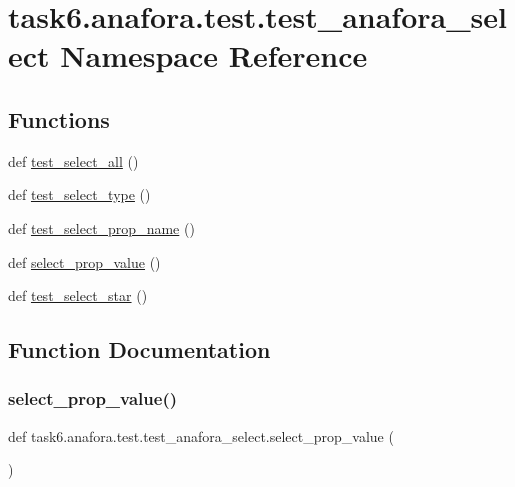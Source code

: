 \hypertarget{namespacetask6_1_1anafora_1_1test_1_1test__anafora__select}{}\section{task6.\+anafora.\+test.\+test\+\_\+anafora\+\_\+select Namespace Reference}
\label{namespacetask6_1_1anafora_1_1test_1_1test__anafora__select}
\subsection*{Functions}
\begin{DoxyCompactItemize}
\item 
def \hyperlink{namespacetask6_1_1anafora_1_1test_1_1test__anafora__select_a88d2142e3e1d6f6ad71cad02f3793e15}{test\+\_\+select\+\_\+all} ()
\item 
def \hyperlink{namespacetask6_1_1anafora_1_1test_1_1test__anafora__select_a9f2f63d4ae51a93c6a11aba7c5f16485}{test\+\_\+select\+\_\+type} ()
\item 
def \hyperlink{namespacetask6_1_1anafora_1_1test_1_1test__anafora__select_a032b0ab5ca00e4ae677f5badbe7a7339}{test\+\_\+select\+\_\+prop\+\_\+name} ()
\item 
def \hyperlink{namespacetask6_1_1anafora_1_1test_1_1test__anafora__select_a805bc16da1e486c9797c468c6b581667}{select\+\_\+prop\+\_\+value} ()
\item 
def \hyperlink{namespacetask6_1_1anafora_1_1test_1_1test__anafora__select_aa807d0116a7f6c2fead9a40c956430f6}{test\+\_\+select\+\_\+star} ()
\end{DoxyCompactItemize}


\subsection{Function Documentation}
\mbox{\label{namespacetask6_1_1anafora_1_1test_1_1test__anafora__select_a805bc16da1e486c9797c468c6b581667}} 
\subsubsection{\texorpdfstring{select\+\_\+prop\+\_\+value()}{select\_prop\_value()}}
{\footnotesize\ttfamily def task6.\+anafora.\+test.\+test\+\_\+anafora\+\_\+select.\+select\+\_\+prop\+\_\+value (\begin{DoxyParamCaption}{ }\end{DoxyParamCaption})}

